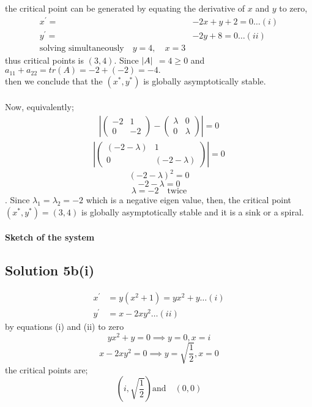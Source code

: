 \documentclass[a4paper, 12pt]{article}
\begin{document}
the critical point can be generated by equating the derivative of $x$ and $y$ to zero, \\
\begin{align*}
x^\prime =& -2x + y + 2 = 0 \ldots (i) \\
y^\prime =& -2y + 8 = 0 \ldots (ii)\\
\text{solving simultaneously} \quad
y = 4, \quad x=3
\end{align*}
thus critical points is $(3, 4)$. Since $\arrowvert A \arrowvert$ $ = 4 \ge 0 $ and $a_{11} +a_{22} = tr(A) = -2+(-2) = -4. $ \\
then we conclude that the $(x^*, y^*)$ is globally asymptotically stable. \\~\\
Now, equivalently;
\begin{align*}
\left|
\begin{pmatrix}
-2 & 1 \\
0 & -2
\end{pmatrix} -
\begin{pmatrix}
\lambda & 0 \\
0 & \lambda
\end{pmatrix}
\right| = 0 
\end{align*}
\begin{align*}
\left|
\begin{pmatrix}
(-2-\lambda) & 1 \\
0 & (-2-\lambda)
\end{pmatrix}
\right| = 0 
\end{align*}
$$ (-2-\lambda) ^2 = 0 $$
$$ -2-\lambda = 0 $$
$$ \lambda = -2 \quad \text{twice} $$. 
Since $ \lambda _{1} = \lambda _{2} = -2 $ which is a negative eigen value, then, the critical point $(x^*, y^*) = (3, 4) $ is globally asymptotically stable and it is a sink or a spiral. \\~\\
\textbf{Sketch of the system}
\subsection{Solution 5b(i)}
\begin{align*}
x^\prime &= y (x^2 +1) = yx^2 + y \ldots (i) \\
y^\prime &= x - 2xy^2 \ldots (ii)
\end{align*}
by equations (i) and (ii) to zero \\
$$ yx^2 + y = 0 \implies y = 0 , x = i $$
$$ x - 2xy^2 = 0 \implies y = \sqrt{\frac{1}{2}}, x = 0 $$
the critical points are; \\
$$ \left(i, \sqrt{\frac{1}{2}}\right)\text {and}\quad  (0, 0)$$
\end{document}
